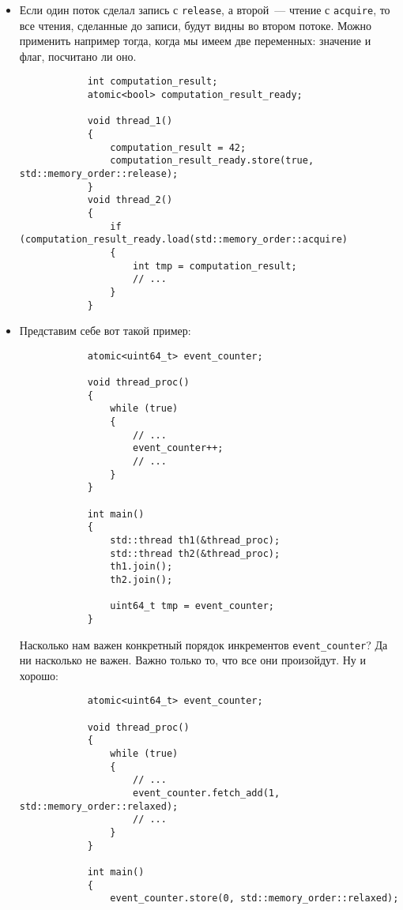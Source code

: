 \documentclass{article}
\begin{document}
    \begin{itemize}
        \item Если один поток сделал запись с \texttt{release}, а второй~--- чтение с \texttt{acquire}, то все чтения, сделанные до записи, будут видны во втором потоке. Можно применить например тогда, когда мы имеем две переменных: значение и флаг, посчитано ли оно.
        \begin{verbatim}
            int computation_result;
            atomic<bool> computation_result_ready;

            void thread_1()
            {
                computation_result = 42;
                computation_result_ready.store(true, std::memory_order::release);
            }
            void thread_2()
            {
                if (computation_result_ready.load(std::memory_order::acquire)
                {
                    int tmp = computation_result;
                    // ...
                }
            }
        \end{verbatim}
        \item Представим себе вот такой пример:
        \begin{verbatim}
            atomic<uint64_t> event_counter;

            void thread_proc()
            {
                while (true)
                {
                    // ...
                    event_counter++;
                    // ...
                }
            }

            int main()
            {
                std::thread th1(&thread_proc);
                std::thread th2(&thread_proc);
                th1.join();
                th2.join();
                
                uint64_t tmp = event_counter;
            }
        \end{verbatim}
        Насколько нам важен конкретный порядок инкрементов \texttt{event_counter}? Да ни насколько не важен. Важно только то, что все они произойдут. Ну и хорошо:
        \begin{verbatim}
            atomic<uint64_t> event_counter;
            
            void thread_proc()
            {
                while (true)
                {
                    // ...
                    event_counter.fetch_add(1, std::memory_order::relaxed);
                    // ...
                }
            }
            
            int main()
            {
                event_counter.store(0, std::memory_order::relaxed);


\end{verbatim}
\end{itemize}
\end{document}
